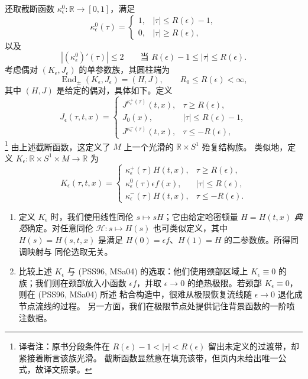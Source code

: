 还取截断函数 $\kappa_\epsilon^0:\mathbb R\to[0,1]$，满足
\begin{equation}
 \kappa_\epsilon^0(\tau)=\begin{cases}
 1,&|\tau|\leq R(\epsilon)-1,\\0,&|\tau|\geq R(\epsilon),
 \end{cases}
 \label{eq:20-kappa-zero}
\end{equation}
以及
\begin{equation}
 |(\kappa_\epsilon^0)'(\tau)|\leq2
 \qquad\text{当 }R(\epsilon)-1\leq|\tau|\leq R(\epsilon).
 \label{eq:20-kappa-derivative}
\end{equation}
考虑偶对 $(K_\epsilon,J_\epsilon)$ 的单参数族，其圆柱端为
\[
 \operatorname{End}_\pm(K_\epsilon,J_\epsilon)=(H,J),
 \qquad R_0\leq R(\epsilon)<\infty,
\]
其中 $(H,J)$ 是给定的\termFloerRegular{}偶对，具体如下。定义
\begin{equation}
 J_\epsilon(\tau,t,x)=\begin{cases}
 J^{\kappa_\epsilon^+(\tau)}(t,x),&\tau\geq R(\epsilon),\\
 J_0(x),&|\tau|\leq R(\epsilon)-1,\\
 J^{\kappa_\epsilon^-(\tau)}(t,x),&\tau\leq-R(\epsilon),
 \end{cases}
 \label{eq:20-j-epsilon}
\end{equation}
\footnote{译者注：原书分段条件在
$R(\epsilon)-1<|\tau|<R(\epsilon)$ 留出未定义的过渡带，却紧接着断言该族光滑。
截断函数显然意在填充该带，但页内未给出唯一公式，故译文照录。}
由上述截断函数，这定义了 $M$ 上一个光滑的 $\mathbb R\times S^1$ 殆复结构族。
类似地，定义 $K_\epsilon:\mathbb R\times S^1\times M\to\mathbb R$ 为
\begin{equation}
 K_\epsilon(\tau,t,x)=\begin{cases}
 \kappa_\epsilon^+(\tau)H(t,x),&\tau\geq R(\epsilon),\\
 \kappa_\epsilon^0(\tau)\epsilon f(x),&|\tau|\leq R(\epsilon),\\
 \kappa_\epsilon^-(\tau)H(t,x),&\tau\leq-R(\epsilon).
 \end{cases}
 \label{eq:20-k-epsilon}
\end{equation}

\begin{remark}
\label{rem:20-choice-k-epsilon}
\begin{enumerate}[label=(\arabic*)]
\item 定义 $K_\epsilon$ 时，我们使用线性同伦 $s\mapsto sH$；它由给定哈密顿量
$H=H(t,x)$ \emph{典范}确定。对任意同伦 $\mathcal H:s\mapsto H(s)$ 也可类似定义，其中
$H(s)=H(s,t,x)$ 是满足 $H(0)=\epsilon f$、$H(1)=H$ 的二参数族。所得同调映射与
同伦选取无关。
\item 比较上述 $K_\epsilon$ 与 (PSS96, MSa04) 的选取：他们使用颈部区域上
$K_\epsilon\equiv0$ 的族；我们则在颈部放入小\personMorse{}函数 $\epsilon f$，并取
$\epsilon\to0$ 的绝热极限。若颈部 $K_\epsilon\equiv0$，则在 (PSS96, MSa04) 所述
粘合构造中，很难从极限恢复\personFloer{}流线随 $\epsilon\to0$ 退化成节点流线的过程。
另一方面，我们在极限节点处提供记住背景\personMorse{}函数的一阶喷注数据。
\end{enumerate}
\end{remark}

